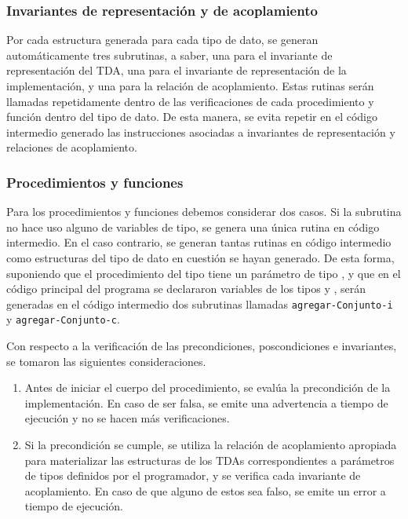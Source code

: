 {{\subsubsection{Invariantes de representación y de acoplamiento}

Por cada estructura generada para cada tipo de dato, se generan automáticamente
tres subrutinas, a saber, una para el invariante de representación del TDA,  una
para el invariante de representación de la implementación, y una para la
relación de acoplamiento. Estas rutinas serán llamadas repetidamente dentro de
las verificaciones de cada procedimiento y función dentro del tipo de dato. De
esta manera, se evita repetir en el código intermedio generado las instrucciones
asociadas a invariantes de representación y relaciones de acoplamiento.

\subsubsection{Procedimientos y funciones}

Para los procedimientos y funciones debemos considerar dos casos. Si la
subrutina no hace uso alguno de variables de tipo, se genera una única rutina en
código intermedio. En el caso contrario, se generan tantas rutinas en código
intermedio como estructuras del tipo de dato en cuestión se hayan generado. De
esta forma, suponiendo que el procedimiento  del tipo
 tiene un parámetro de tipo , y que en
el código principal del programa se declararon variables de los tipos
 y , serán generadas en el código
intermedio dos subrutinas llamadas \texttt{agregar-Conjunto-i} y
\texttt{agregar-Conjunto-c}.

Con respecto a la verificación de las precondiciones, poscondiciones e
invariantes, se tomaron las siguientes consideraciones.

\begin{enumerate}

  \item Antes de iniciar el cuerpo del procedimiento, se evalúa la precondición
  de la implementación. En caso de ser falsa, se emite una advertencia a tiempo
  de ejecución y no se hacen más verificaciones.

  \item Si la precondición se cumple, se utiliza la relación de acoplamiento
  apropiada para materializar las estructuras de los TDAs correspondientes a
  parámetros de tipos definidos por el programador, y se verifica cada invariante
  de acoplamiento. En caso de que alguno de estos sea falso, se emite un error a
  tiempo de ejecución.


\end{enumerate}}}
